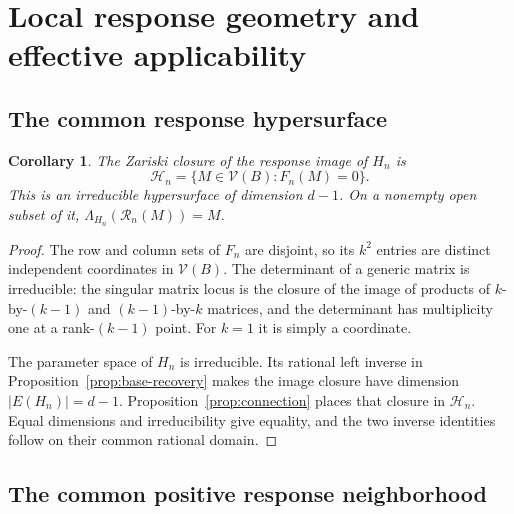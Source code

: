 \documentclass[11pt]{article}
\newtheorem{corollary}[theorem]{Corollary}
\theoremstyle{definition}
\newcommand{\Vresp}{\mathcal V}
\newcommand{\rec}{\mathcal R}
\begin{document}
\section{Local response geometry and effective applicability}
\label{sec:effective}

\subsection{The common response hypersurface}

\begin{corollary}
\label{cor:base-hypersurface}
The Zariski closure of the response image of \(H_n\) is
\[
 \mathcal H_n=\{M\in\Vresp(B):F_n(M)=0\}.
\]
This is an irreducible hypersurface of dimension \(d-1\).
On a nonempty open subset of it,
\(\Lambda_{H_n}(\rec_n(M))=M\).
\end{corollary}
\begin{proof}
The row and column sets of \(F_n\) are disjoint, so its \(k^2\)
entries are distinct independent coordinates in \(\Vresp(B)\).
The determinant of a generic matrix is irreducible: the singular
matrix locus is the closure of the image of products of
\(k\)-by-\((k-1)\) and \((k-1)\)-by-\(k\) matrices, and the determinant
has multiplicity one at a rank-\((k-1)\) point.
For \(k=1\) it is simply a coordinate.

The parameter space of \(H_n\) is irreducible. Its rational left
inverse in Proposition~\ref{prop:base-recovery} makes the image
closure have dimension \(|E(H_n)|=d-1\).
Proposition~\ref{prop:connection} places that closure in
\(\mathcal H_n\). Equal dimensions and irreducibility give equality,
and the two inverse identities follow on their common rational domain.
\end{proof}

\subsection{The common positive response neighborhood}
\end{document}

